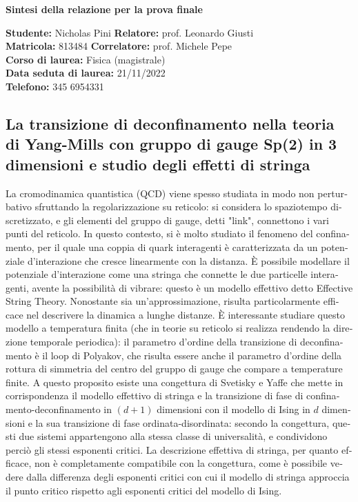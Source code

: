 \documentclass[reqno,11pt]{article}
\numberwithin{equation}{section}
\begin{document}
\begin{otherlanguage}{italian}

\pagestyle{empty}
    \begin{center}
        \textbf{\huge{Sintesi della relazione per la prova finale}} 
    \end{center}
    \medskip
    \textbf{Studente:} Nicholas Pini \hfill \textbf{Relatore:} prof. Leonardo Giusti \\
    \textbf{Matricola:} 813484       \hfill \textbf{Correlatore:} prof. Michele Pepe \\
    \textbf{Corso di laurea:} Fisica (magistrale) \\
	\textbf{Data seduta di laurea:} 21/11/2022 \\
    \textbf{Telefono:} 345 6954331

\subsection*{La transizione di deconfinamento nella teoria di Yang-Mills con gruppo di gauge Sp(2) in 3 dimensioni e studio degli effetti di stringa}

La cromodinamica quantistica (QCD) viene spesso studiata in modo non perturbativo sfruttando la regolarizzazione su reticolo: 
si considera lo spaziotempo discretizzato, e gli elementi del gruppo di gauge, detti "link", connettono i vari punti del reticolo.
In questo contesto, si è molto studiato il fenomeno del confinamento, per il quale una coppia di quark interagenti è caratterizzata da un potenziale
d'interazione che cresce linearmente con la distanza. È possibile modellare il potenziale d'interazione come una stringa che connette
le due particelle interagenti, avente la possibilità di vibrare: questo è un modello effettivo detto Effective String Theory. 
Nonostante sia un'approssimazione, risulta particolarmente efficace nel descrivere la dinamica a lunghe distanze. È interessante studiare
questo modello a temperatura finita (che in teorie su reticolo si realizza rendendo la direzione temporale periodica): il parametro d'ordine
della transizione di deconfinamento è il loop di Polyakov, che risulta essere anche il parametro d'ordine della rottura di simmetria
del centro del gruppo di gauge che compare a temperature finite. A questo proposito esiste una congettura di Svetisky e Yaffe che mette in corrispondenza il modello effettivo di stringa e la transizione di fase
di confinamento-deconfinamento in $(d+1)$ dimensioni con il modello di Ising in $d$ dimensioni e la sua transizione di fase ordinata-disordinata:
secondo la congettura, questi due sistemi appartengono alla stessa classe di universalità, e condividono perciò gli stessi esponenti critici.
La descrizione effettiva di stringa, per quanto efficace, non è completamente compatibile con la congettura, come è possibile vedere
dalla differenza degli esponenti critici con cui il modello di stringa approccia il punto critico rispetto agli esponenti critici
del modello di Ising.


\end{otherlanguage}
\end{document}

